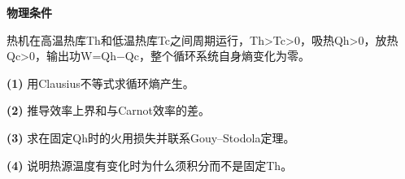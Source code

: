 \textbf{物理条件}\par 热机在高温热库Th和低温热库Tc之间周期运行，Th>Tc>0，吸热Qh>0，放热Qc>0，输出功W=Qh−Qc，整个循环系统自身熵变化为零。
\par\noindent\textbf{(1)} 用Clausius不等式求循环熵产生。
\par\noindent\textbf{(2)} 推导效率上界和与Carnot效率的差。
\par\noindent\textbf{(3)} 求在固定Qh时的火用损失并联系Gouy–Stodola定理。
\par\noindent\textbf{(4)} 说明热源温度有变化时为什么须积分而不是固定Th。

